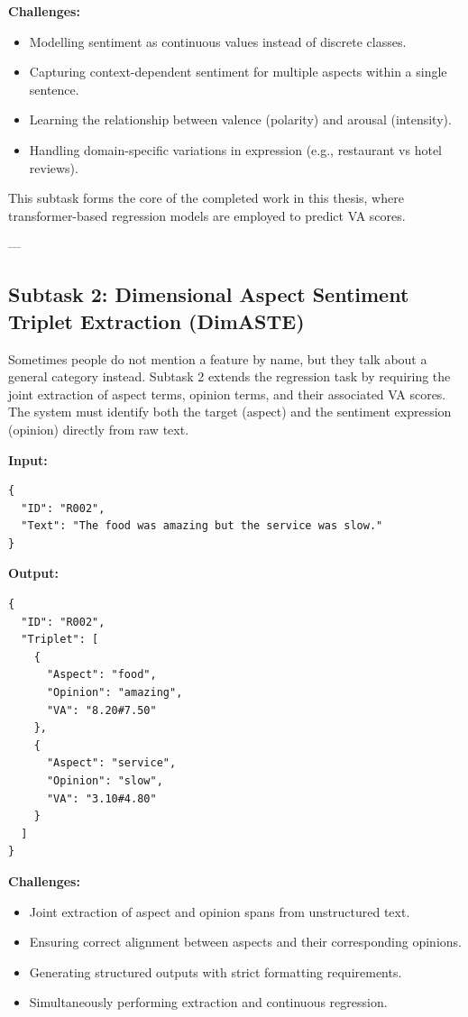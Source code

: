 \documentclass{article}
\begin{document}
\textbf{Challenges:}
\begin{itemize}
    \item Modelling sentiment as continuous values instead of discrete classes.
    \item Capturing context-dependent sentiment for multiple aspects within a single sentence.
    \item Learning the relationship between valence (polarity) and arousal (intensity).
    \item Handling domain-specific variations in expression (e.g., restaurant vs hotel reviews).
\end{itemize}

This subtask forms the core of the completed work in this thesis, where transformer-based regression models are employed to predict VA scores.

---

\subsection{Subtask 2: Dimensional Aspect Sentiment Triplet Extraction (DimASTE)}

Sometimes people do not mention a feature by name, but they talk about a general category instead. Subtask 2 extends the regression task by requiring the joint extraction of aspect terms, opinion terms, and their associated VA scores. The system must identify both the target (aspect) and the sentiment expression (opinion) directly from raw text.

\textbf{Input:}
\begin{verbatim}
{
  "ID": "R002",
  "Text": "The food was amazing but the service was slow."
}
\end{verbatim}

\textbf{Output:}
\begin{verbatim}
{
  "ID": "R002",
  "Triplet": [
    {
      "Aspect": "food",
      "Opinion": "amazing",
      "VA": "8.20#7.50"
    },
    {
      "Aspect": "service",
      "Opinion": "slow",
      "VA": "3.10#4.80"
    }
  ]
}
\end{verbatim}

\textbf{Challenges:}
\begin{itemize}
    \item Joint extraction of aspect and opinion spans from unstructured text.
    \item Ensuring correct alignment between aspects and their corresponding opinions.
    \item Generating structured outputs with strict formatting requirements.
    \item Simultaneously performing extraction and continuous regression.
\end{itemize}
\end{document}
